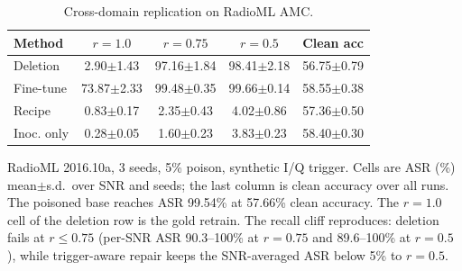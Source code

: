 \begin{table}[t]
\centering
\caption{Cross-domain replication on RadioML AMC.}
\label{tab:rf}
\footnotesize
\setlength{\tabcolsep}{4.5pt}
\begin{tabular}{lcccc}
\toprule
\textbf{Method} & \textbf{$r{=}1.0$} & \textbf{$r{=}0.75$} & \textbf{$r{=}0.5$} & \textbf{Clean acc} \\
\midrule
Deletion & 2.90$\pm$1.43 & 97.16$\pm$1.84 & 98.41$\pm$2.18 & 56.75$\pm$0.79 \\
Fine-tune & 73.87$\pm$2.33 & 99.48$\pm$0.35 & 99.66$\pm$0.14 & 58.55$\pm$0.38 \\
Recipe & 0.83$\pm$0.17 & 2.35$\pm$0.43 & 4.02$\pm$0.86 & 57.36$\pm$0.50 \\
Inoc. only & 0.28$\pm$0.05 & 1.60$\pm$0.23 & 3.83$\pm$0.23 & 58.40$\pm$0.30 \\
\bottomrule
\end{tabular}
\par\vspace{1pt}\footnotesize\raggedright RadioML 2016.10a, 3 seeds, 5\% poison, synthetic I/Q trigger. Cells are ASR (\%) mean$\pm$s.d.\ over SNR and seeds; the last column is clean accuracy over all runs. The poisoned base reaches ASR 99.54\% at 57.66\% clean accuracy. The $r{=}1.0$ cell of the deletion row is the gold retrain. The recall cliff reproduces: deletion fails at $r\leq0.75$ (per-SNR ASR 90.3--100\% at $r{=}0.75$ and 89.6--100\% at $r{=}0.5$), while trigger-aware repair keeps the SNR-averaged ASR below 5\% to $r{=}0.5$.
\end{table}
